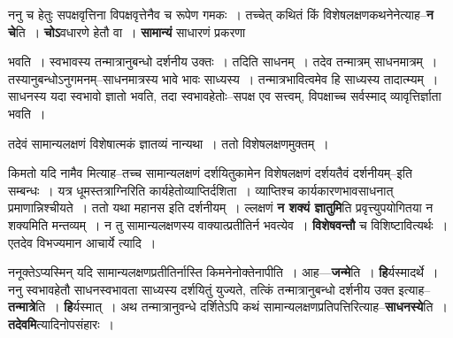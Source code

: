 \documentclass[article,12pt,a4paper]{memoir}
\begin{document}
	  \pstart ननु च हेतुः सपक्षवृत्तिना विपक्षवृत्तेनैव च रूपेण गमकः । तच्चेत् कथितं किं विशेषलक्षणकथनेनेत्याह--\textbf{न चे}ति । \textbf{चोऽ}वधारणे हेतौ वा । \textbf{सामान्यं} साधारणं प्रकरणा  \leavevmode{} 
	  
	भवति । स्वभावस्य तन्मात्रानुबन्धो दर्शनीय उक्तः । तदिति साधनम् । तदेव तन्मात्रम् साधनमात्रम् । तस्यानुबन्धोऽनुगमनम्--साधनमात्रस्य भावे भावः साध्यस्य । तन्मात्रभावित्वमेव हि साध्यस्य तादात्म्यम् । साधनस्य यदा स्वभावो ज्ञातो भवति, तदा स्वभावहेतोः--सपक्ष एव सत्त्वम्, विपक्षाच्च सर्वस्माद् व्यावृत्तिर्ज्ञाता भवति ।  
	  
	तदेवं सामान्यलक्षणं विशेषात्मकं ज्ञातव्यं नान्यथा । ततो विशेषलक्षणमुक्तम् ।  
	  
	किमतो यदि नामैव मित्याह--तच्च सामान्यलक्षणं दर्शयितुकामेन विशेषलक्षणं दर्शयतैवं दर्शनीयम्--इति सम्बन्धः । यत्र धूमस्तत्राग्निरिति कार्यहेतोव्याप्तिर्दशिता । व्याप्तिश्च कार्यकारणभावसाधनात् प्रमाणान्निश्चीयते । ततो यथा महानस इति दर्शनीयम् । ल्लक्षणं \textbf{न शक्यं ज्ञातुमि}ति प्रवृत्त्युपयोगितया न शक्यमिति मन्तव्यम् । न तु सामान्यलक्षणस्य वाक्यात्प्रतीतिर्न भवत्येव । \textbf{विशेषवन्तौ} च विशिष्टावित्यर्थः । एतदेव विभज्यमान आचार्ये त्यादि ।
	\pend
      

	  \pstart ननूक्तेऽप्यस्मिन् यदि सामान्यलक्षणप्रतीतिर्नास्ति किमनेनोक्तेनापीति । आह—\textbf{जन्मे}ति । \textbf{हि}र्यस्मादर्थे । ननु स्वभावहेतौ साधनस्वभावता साध्यस्य दर्शयितुं युज्यते, तत्किं तन्मात्रानुबन्धो दर्शनीय उक्त इत्याह--\textbf{तन्मात्रे}ति । \textbf{हि}र्यस्मात् । अथ तन्मात्रानुवन्धे दर्शितेऽपि कथं सामान्यलक्षणप्रतिपत्तिरित्याह--\textbf{साधनस्ये}ति । \textbf{तदेवमि}त्यादिनोपसंहारः ।
	\pend
      
\end{document}
